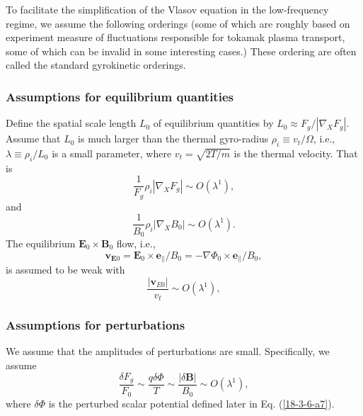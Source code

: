 \documentclass{article}
\begin{document}
To facilitate the simplification of the Vlasov equation in the low-frequency
regime, we assume the following orderings (some of which are roughly based on
experiment measure of fluctuations responsible for tokamak plasma transport,
some of which can be invalid in some interesting cases.) These ordering are
often called the standard gyrokinetic orderings.

\subsubsection{Assumptions for equilibrium quantities}

Define the spatial scale length $L_0$ of equilibrium quantities by $L_0
\approx F_g / | \nabla_X F_g |$. Assume that $L_0$ is much larger than the
thermal gyro-radius $\rho_i \equiv v_t / \Omega$, i.e., $\lambda \equiv \rho_i
/ L_0$ is a small parameter, where $v_t = \sqrt{2 T / m}$ is the thermal
velocity. That is
\begin{equation}
  \label{17-5-15-1} \frac{1}{F_g} \rho_i | \nabla_X F_g | \sim O (\lambda^1),
\end{equation}
and
\begin{equation}
  \frac{1}{B_0} \rho_i | \nabla_X B_0 | \sim O (\lambda^1) .
\end{equation}
The equilibrium $\mathbf{E}_0 \times \mathbf{B}_0$ flow, i.e.,
\begin{equation}
  \mathbf{v}_{\mathbf{E}0} =\mathbf{E}_0 \times \mathbf{e}_{\parallel} / B_0 =
  - \nabla \Phi_0 \times \mathbf{e}_{\parallel} / B_0,
\end{equation}
is assumed to be weak with
\begin{equation}
  \frac{| \mathbf{v}_{E 0} |}{v_t} \sim O (\lambda^1),
\end{equation}

\subsubsection{Assumptions for perturbations}

We assume that the amplitudes of perturbations are small. Specifically, we
assume
\begin{equation}
  \frac{\delta F_g}{F_0} \sim \frac{q \delta \Phi}{T} \sim \frac{| \delta
  \mathbf{B} |}{B_0} \sim O (\lambda^1),
\end{equation}
where $\delta \Phi$ is the perturbed scalar potential defined later in Eq.
(\ref{18-3-6-a7}).
\end{document}
